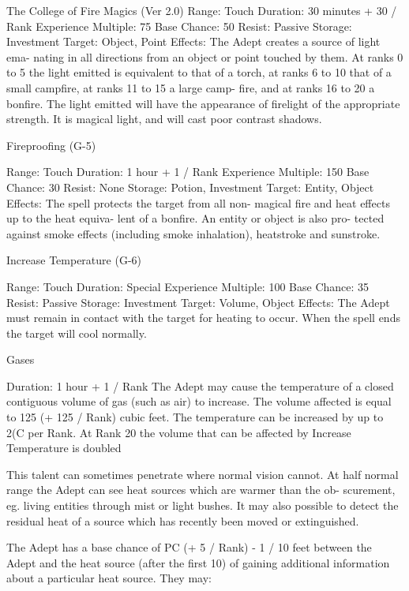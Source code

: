 \begin{Chapter}{The College of Fire Magics (Ver 2.0)}
Range: Touch 
Duration: 30 minutes + 30 / Rank 
Experience Multiple: 75 
Base Chance: 50%
Resist: Passive 
Storage: Investment 
Target: Object, Point 
Effects:  The  Adept  creates  a  source  of  light  ema-
nating  in  all  directions  from  an  object  or  point 
touched by them. At ranks 0 to 5 the light emitted 
is equivalent to that of a torch, at ranks 6 to 10 that 
of a small campfire, at ranks 11 to 15 a large camp-
fire,  and  at  ranks  16  to  20  a  bonfire.  The  light 
emitted will have the appearance of firelight of the 
appropriate  strength.  It  is  magical  light,  and  will 
cast poor contrast shadows. 

Fireproofing (G-5) 

Range: Touch 
Duration: 1 hour + 1 / Rank 
Experience Multiple: 150 
Base Chance: 30%
Resist: None 
Storage: Potion, Investment 
Target: Entity, Object 
Effects:  The  spell  protects  the  target from all  non-
magical fire and heat effects up to the heat equiva-
lent  of  a  bonfire.  An  entity  or  object  is  also  pro-
tected  against  smoke  effects  (including  smoke 
inhalation), heatstroke and sunstroke. 

Increase Temperature (G-6) 

Range: Touch 
Duration: Special 
Experience Multiple: 100 
Base Chance: 35%
Resist: Passive 
Storage: Investment 
Target: Volume, Object 
Effects: The Adept must remain in contact with the 
target for heating to occur. When the spell ends the 
target will cool normally. 

Gases 

Duration: 1 hour + 1 / Rank 
The  Adept  may  cause  the  temperature  of  a  closed 
contiguous volume of gas (such as air) to increase. 
The volume affected is equal to 125 (+ 125 / Rank) 
cubic feet. The temperature can be increased by up 
to  2(C  per  Rank.  At  Rank  20  the  volume  that  can 
be affected by Increase Temperature is doubled 

This  talent can  sometimes penetrate where  normal 
vision cannot. At half normal  range the Adept can 
see  heat  sources  which  are  warmer  than  the  ob-
scurement,  eg.  living  entities  through  mist  or  light 
bushes.  It  may  also  possible  to  detect  the  residual 
heat of a source which has recently been moved or 
extinguished. 

The Adept has a base chance of PC (+ 5 / Rank) - 1 
/  10  feet  between  the  Adept  and  the  heat  source 
(after the first 10) of gaining additional information 
about a particular heat source. They may:  


\end{Chapter}
